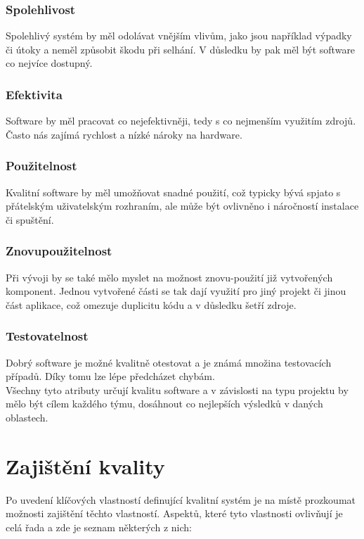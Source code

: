 		\subsubsection{Spolehlivost}
			Spolehlivý systém by měl odolávat vnějším vlivům, jako jsou například výpadky či útoky a neměl způsobit škodu při selhání. V důsledku by pak měl být software co nejvíce dostupný.
		
		\subsubsection{Efektivita}
			Software by měl pracovat co nejefektivněji, tedy s co nejmenším využitím zdrojů. Často nás zajímá rychlost a nízké nároky na hardware.
		
		\subsubsection{Použitelnost}
			Kvalitní software by měl umožňovat snadné použití, což typicky bývá spjato s přátelským uživatelským rozhraním, ale může být ovlivněno i náročností instalace či spuštění.
		
		\subsubsection{Znovupoužitelnost}
			Při vývoji by se také mělo myslet na možnost znovu-použití již vytvořených komponent. Jednou vytvořené části se tak dají využití pro jiný projekt či jinou část aplikace, což omezuje duplicitu kódu a v důsledku šetří zdroje.
		
		\subsubsection{Testovatelnost}
			Dobrý software je možné kvalitně otestovat a je známá množina testovacích případů. Díky tomu lze lépe předcházet chybám.\\

Všechny tyto atributy určují kvalitu software a v závislosti na typu projektu by mělo být cílem každého týmu, dosáhnout co nejlepších výsledků v daných oblastech. 


\section{Zajištění kvality}
Po uvedení klíčových vlastností definující kvalitní systém je na místě prozkoumat možnosti zajištění těchto vlastností. Aspektů, které tyto vlastnosti ovlivňují je celá řada a zde je seznam některých z nich:

